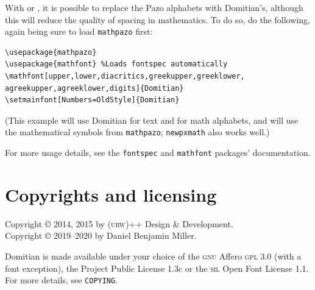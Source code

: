 \documentclass[12pt]{article}
\begin{document}
With  or , it is possible to replace the Pazo alphabets with Domitian's, although this will reduce the quality of spacing in mathematics. To do so, do the following, again being sure to load \texttt{mathpazo} first:

\begin{verbatim}
\usepackage{mathpazo}
\usepackage{mathfont} %Loads fontspec automatically
\mathfont[upper,lower,diacritics,greekupper,greeklower,
agreekupper,agreeklower,digits]{Domitian}
\setmainfont[Numbers=OldStyle]{Domitian}
\end{verbatim}


(This example will use Domitian for text and for math alphabets, and will use
the mathematical symbols from \texttt{mathpazo}; \texttt{newpxmath} also works well.)



For more usage details, see the \texttt{fontspec} and \texttt{mathfont} packages' documentation.

\section{Copyrights and licensing}
Copyright © 2014, 2015 by (\textsc{urw})++ Design \& Development.\\
Copyright © 2019--2020 by Daniel Benjamin Miller.

Domitian is made available under your choice of the \textsc{gnu} Affero \textsc{gpl} 3.0 (with a font
exception), the  Project Public License 1.3c or the \textsc{sil} Open Font License
1.1. For more details, see \texttt{COPYING}.
\end{document}
